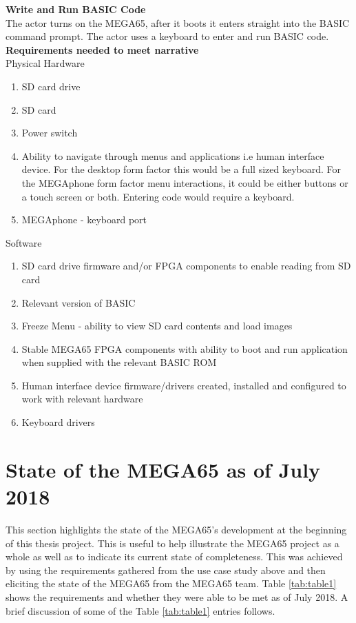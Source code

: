 \textbf{Write and Run BASIC Code}\\
The actor turns on the MEGA65, after it boots it enters straight into the BASIC command prompt. The actor uses a keyboard to enter and run BASIC code. \\

\textbf{Requirements needed to meet narrative}\\
Physical Hardware
\begin{enumerate}
\item SD card drive
\item SD card
\item Power switch
\item Ability to navigate through menus and applications i.e human interface device. For the desktop form factor this would be a full sized keyboard. For the MEGAphone form factor menu interactions, it could be either buttons or a touch screen or both. Entering code would require a keyboard.
\item MEGAphone - keyboard port
\end{enumerate}

Software\\
\begin{enumerate}
\item SD card drive firmware and/or FPGA components to enable reading from SD card
\item Relevant version of BASIC 
\item Freeze Menu - ability to view SD card contents and load images
\item Stable MEGA65 FPGA components with ability to boot and run application when supplied with the relevant BASIC ROM
\item Human interface device firmware/drivers created, installed and configured to work with relevant hardware
\item Keyboard drivers
\end{enumerate}

\section{State of the MEGA65 as of July 2018}
This section highlights the state of the MEGA65's development at the beginning of this thesis project. This is useful to help illustrate the MEGA65 project as a whole as well as to indicate its current state of completeness. This was achieved by using the requirements gathered from the use case study above and then eliciting the state of the MEGA65 from the MEGA65 team. Table \ref{tab:table1} shows the requirements and whether they were able to be met as of July 2018. A brief discussion of some of the Table \ref{tab:table1} entries follows. 

